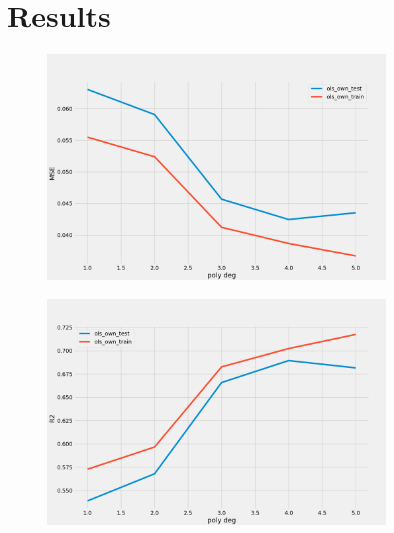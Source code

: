 \section{Results}



\begin{figure}[H]
    \centering
    \includegraphics[width=0.8\textwidth]{Figures/b_mse.png}
\end{figure}

\begin{figure}[H]
    \centering
    \includegraphics[width=0.8\textwidth]{Figures/b_r2.png}
\end{figure}

